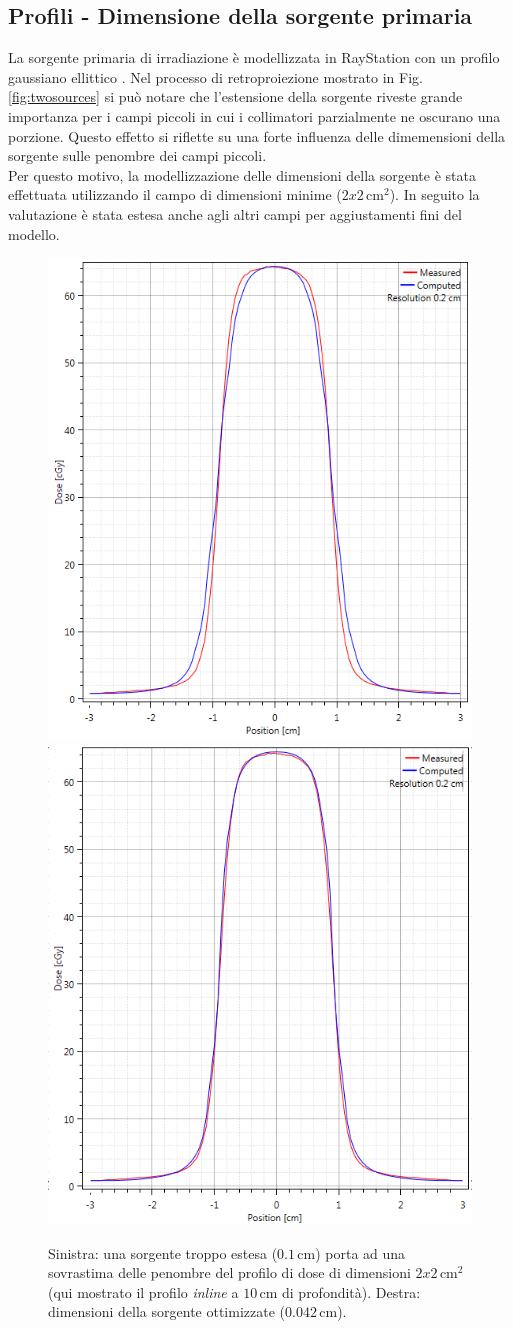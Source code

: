 \subsection{Profili - Dimensione della sorgente primaria}
La sorgente primaria di irradiazione è modellizzata in RayStation con un profilo gaussiano ellittico \cite{Chaney1994}. Nel processo di retroproiezione mostrato in Fig.\ref{fig:twosources} si può notare che l'estensione della sorgente riveste grande importanza per i campi piccoli in cui i collimatori parzialmente ne oscurano una porzione. Questo effetto si riflette su una forte influenza delle dimemensioni della sorgente sulle penombre dei campi piccoli.\\
Per questo motivo, la modellizzazione delle dimensioni della sorgente è stata effettuata utilizzando il campo di dimensioni minime ($2x2\,$cm$^2$). In seguito la valutazione è stata estesa anche agli altri campi per aggiustamenti fini del modello.
\begin{figure}
\centering
\includegraphics[width=.48\textwidth]{./cap2/Ray_penumbra_wrong.PNG}
\includegraphics[width=.48\textwidth]{./cap2/Ray_penumbra_right.PNG}
\caption{Sinistra: una sorgente troppo estesa ($0.1\,$cm) porta ad una sovrastima delle penombre del profilo di dose di dimensioni $2x2\,$cm$^2$ (qui mostrato il profilo \textit{inline} a $10\,$cm di profondità). Destra: dimensioni della sorgente ottimizzate ($0.042\,$cm).}
\label{fig:source_2x2}
\end{figure}


